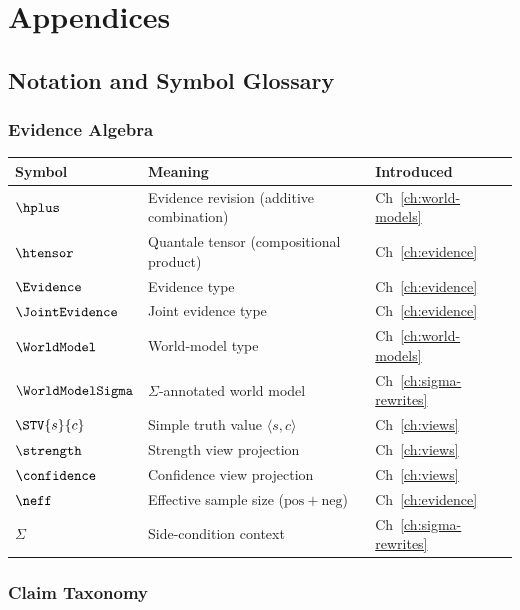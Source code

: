\documentclass[11pt,openany]{report}
\begin{document}
\part{Appendices}
\label{part:appendices}

\chapter{Notation and Symbol Glossary}
\label{app:notation}

\section*{Evidence Algebra}

\begin{longtable}{@{}lp{}l@{}}
\toprule
Symbol & Meaning & Introduced \\
\midrule
$\hplus$ & Evidence revision (additive combination) & Ch~\ref{ch:world-models} \\
$\htensor$ & Quantale tensor (compositional product) & Ch~\ref{ch:evidence} \\
$\Evidence$ & Evidence type & Ch~\ref{ch:evidence} \\
$\JointEvidence$ & Joint evidence type & Ch~\ref{ch:evidence} \\
$\WorldModel$ & World-model type & Ch~\ref{ch:world-models} \\
$\WorldModelSigma$ & $\Sigma$-annotated world model & Ch~\ref{ch:sigma-rewrites} \\
$\STV{s}{c}$ & Simple truth value $\langle s, c \rangle$ & Ch~\ref{ch:views} \\
$\strength$ & Strength view projection & Ch~\ref{ch:views} \\
$\confidence$ & Confidence view projection & Ch~\ref{ch:views} \\
$\neff$ & Effective sample size ($\mathrm{pos} + \mathrm{neg}$) & Ch~\ref{ch:evidence} \\
$\Sigma$ & Side-condition context & Ch~\ref{ch:sigma-rewrites} \\
\bottomrule
\end{longtable}

\section*{Claim Taxonomy}
\end{document}
